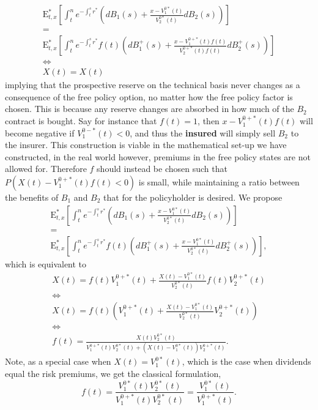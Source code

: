 \documentclass[12pt]{article}
\newcommand{\E}{\text{E}}
\newcommand\ddfrac[2]{\frac{\displaystyle #1}{\displaystyle #2}}
\begin{document}
\begin{gather*}
\E^*_{t,x} \left[ \int_t^n e^{-\int_t^sr^*} \left( dB_1(s) + \frac{x-V_1^{0*}(t)}{V_2^{0*}(t)} dB_2(s) \right)  \right]
\\
=
\\
\E^*_{t,x} \left[ \int_t^n e^{-\int_t^sr^*} f(t) \left( dB_1^+(s) + \frac{x-V_1^{0+*}(t)f(t)}{V_2^{0+*}(t)f(t)} dB_2^+(s) \right)  \right]
\\
\Leftrightarrow
\\
X(t)=X(t)
\end{gather*}
implying that the prospective reserve on the technical basis never changes as a consequence of the free policy option, no matter how the free policy factor is chosen. This is because any reserve changes are absorbed in how much of the $B_2$ contract is bought. Say for instance that $f(t)=1$, then $x-V_1^{0+*}(t)f(t)$ will become negative if $V_1^{0-*}(t)<0$, and thus the \textbf{insured} will simply sell $B_2$ to the insurer. This construction is viable in the mathematical set-up we have constructed, in the real world however, premiums in the free policy states are not allowed for. Therefore $f$ should instead be chosen such that $P(X(t)-V_1^{0+*}(t)f(t)<0)$ is small, while maintaining a ratio between the benefits of $B_1$ and $B_2$ that for the policyholder is desired. We propose
\begin{gather*}
\E^*_{t,x} \left[ \int_t^n e^{-\int_t^sr^*} \left( dB_1(s) + \frac{x-V_1^{0*}(t)}{V_2^{0*}(t)} dB_2(s) \right)  \right]
\\
=
\\
\E^*_{t,x} \left[ \int_t^n e^{-\int_t^sr^*} f(t) \left( dB_1^+(s) + \frac{x-V_1^{0*}(t)}{V_2^{0*}(t)} dB_2^+(s) \right)  \right],
\end{gather*}
which is equivalent to
\begin{gather}
X(t)=f(t)V_1^{0+*}(t)+\frac{X(t)-V_1^{0*}(t)}{V_2^{0*}(t)}f(t)V_2^{0+*}(t)
\nonumber \\
\Leftrightarrow
\nonumber \\
X(t)=f(t) \left( V_1^{0+*}(t)+\frac{X(t)-V_1^{0*}(t)}{V_2^{0*}(t)}V_2^{0+*}(t)\right)
\nonumber \\
\Leftrightarrow
\nonumber \\
f(t)=\ddfrac{X(t)V_2^{0*}(t)}{V_1^{0+*}(t)V_2^{0*}(t)+(X(t)-V_1^{0*}(t))V_2^{0+*}(t) }.\label{eq:AAF}
\end{gather}
Note, as a special case when $X(t)=V_1^{0*}(t)$, which is the case when dividends equal the risk premiums, we get the classical formulation,
$$
f(t)=\ddfrac{V_1^{0*}(t)V_2^{0*}(t)}{V_1^{0+*}(t)V_2^{0*}(t)}=\ddfrac{V_1^{0*}(t)}{V_1^{0+*}(t)}.
$$
\end{document}

